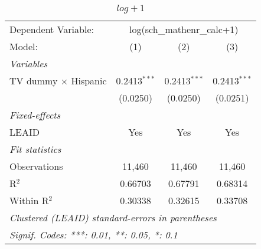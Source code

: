 \begin{table}[htbp]
\centering
\caption{ $log + 1$}
\begin{tabular}{lccc}
\tabularnewline\midrule\midrule
Dependent Variable:&\multicolumn{3}{c}{log(sch\_mathenr\_calc+1)}\\
Model:&(1) & (2) & (3)\\
\midrule \emph{Variables}&   &   &  \\
TV dummy $\times$ Hispanic & 0.2413$^{***}$ & 0.2413$^{***}$ & 0.2413$^{***}$\\
  &(0.0250) & (0.0250) & (0.0251)\\
\midrule \emph{Fixed-effects}&   &   &  \\
LEAID & Yes & Yes & Yes\\
\midrule \emph{Fit statistics}&  & & \\
Observations & 11,460&11,460&11,460\\
R$^2$ & 0.66703&0.67791&0.68314\\
Within R$^2$ & 0.30338&0.32615&0.33708\\
\midrule\midrule\multicolumn{4}{l}{\emph{Clustered (LEAID) standard-errors in parentheses}}\\
\multicolumn{4}{l}{\emph{Signif. Codes: ***: 0.01, **: 0.05, *: 0.1}}\\
\end{tabular}
\end{table}

